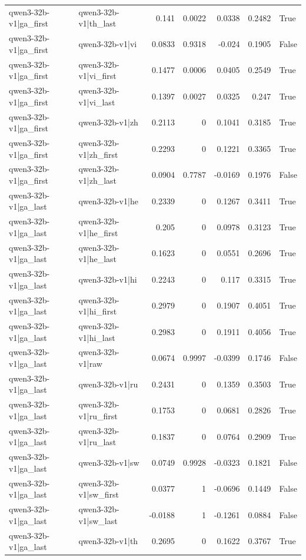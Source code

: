 \begin{table}
\begin{tabular}{l l r r r r l}
qwen3-32b-v1|ga_first & qwen3-32b-v1|th_last & 0.141 & 0.0022 & 0.0338 & 0.2482 & True \\
qwen3-32b-v1|ga_first & qwen3-32b-v1|vi & 0.0833 & 0.9318 & -0.024 & 0.1905 & False \\
qwen3-32b-v1|ga_first & qwen3-32b-v1|vi_first & 0.1477 & 0.0006 & 0.0405 & 0.2549 & True \\
qwen3-32b-v1|ga_first & qwen3-32b-v1|vi_last & 0.1397 & 0.0027 & 0.0325 & 0.247 & True \\
qwen3-32b-v1|ga_first & qwen3-32b-v1|zh & 0.2113 & 0 & 0.1041 & 0.3185 & True \\
qwen3-32b-v1|ga_first & qwen3-32b-v1|zh_first & 0.2293 & 0 & 0.1221 & 0.3365 & True \\
qwen3-32b-v1|ga_first & qwen3-32b-v1|zh_last & 0.0904 & 0.7787 & -0.0169 & 0.1976 & False \\
qwen3-32b-v1|ga_last & qwen3-32b-v1|he & 0.2339 & 0 & 0.1267 & 0.3411 & True \\
qwen3-32b-v1|ga_last & qwen3-32b-v1|he_first & 0.205 & 0 & 0.0978 & 0.3123 & True \\
qwen3-32b-v1|ga_last & qwen3-32b-v1|he_last & 0.1623 & 0 & 0.0551 & 0.2696 & True \\
qwen3-32b-v1|ga_last & qwen3-32b-v1|hi & 0.2243 & 0 & 0.117 & 0.3315 & True \\
qwen3-32b-v1|ga_last & qwen3-32b-v1|hi_first & 0.2979 & 0 & 0.1907 & 0.4051 & True \\
qwen3-32b-v1|ga_last & qwen3-32b-v1|hi_last & 0.2983 & 0 & 0.1911 & 0.4056 & True \\
qwen3-32b-v1|ga_last & qwen3-32b-v1|raw & 0.0674 & 0.9997 & -0.0399 & 0.1746 & False \\
qwen3-32b-v1|ga_last & qwen3-32b-v1|ru & 0.2431 & 0 & 0.1359 & 0.3503 & True \\
qwen3-32b-v1|ga_last & qwen3-32b-v1|ru_first & 0.1753 & 0 & 0.0681 & 0.2826 & True \\
qwen3-32b-v1|ga_last & qwen3-32b-v1|ru_last & 0.1837 & 0 & 0.0764 & 0.2909 & True \\
qwen3-32b-v1|ga_last & qwen3-32b-v1|sw & 0.0749 & 0.9928 & -0.0323 & 0.1821 & False \\
qwen3-32b-v1|ga_last & qwen3-32b-v1|sw_first & 0.0377 & 1 & -0.0696 & 0.1449 & False \\
qwen3-32b-v1|ga_last & qwen3-32b-v1|sw_last & -0.0188 & 1 & -0.1261 & 0.0884 & False \\
qwen3-32b-v1|ga_last & qwen3-32b-v1|th & 0.2695 & 0 & 0.1622 & 0.3767 & True \\

\end{tabular}
\end{table}
